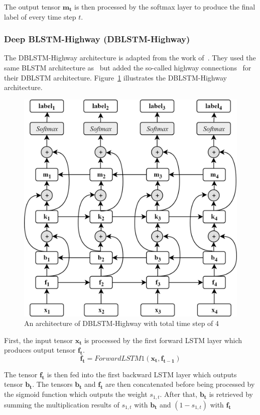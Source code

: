 The output tensor $\mathbf{m_{t}}$ is then processed by the softmax layer to produce the final label of every time step $t$.

\subsubsection{Deep BLSTM-Highway (DBLSTM-Highway)}
The DBLSTM-Highway architecture is adapted from the work of~\cite{he2017deep}. They used the same BLSTM architecture as~\cite{zhou2015end} but added the so-called highway connections~\citep{srivastava2015training} for their DBLSTM architecture. Figure~\ref{fig:dblstmhighway} illustrates the DBLSTM-Highway architecture.

\begin{figure}
	\centering
	\includegraphics[width=0.75\linewidth]{images/dblstmhighway}
	\caption{An architecture of DBLSTM-Highway with total time step of 4}
	\label{fig:dblstmhighway}
\end{figure}

First, the input tensor $\mathbf{x_{t}}$ is processed by the first forward LSTM layer which produces output tensor $\mathbf{f_{t}}$.
\begin{equation}
\label{eq:forwardhighway1}
\mathbf{f_{t}} = ForwardLSTM1(\mathbf{x_{t}}, \mathbf{f_{t-1}})
\end{equation}

The tensor $\mathbf{f_{t}}$ is then fed into the first backward LSTM layer which outputs tensor $\mathbf{b_{t}}$. The tensors $\mathbf{b_{t}}$ and $\mathbf{f_{t}}$ are then concatenated before being processed by the sigmoid function which outputs the weight $s_{1,t}$. After that, $\mathbf{b_{t}}$ is retrieved by summing the multiplication results of $s_{1,t}$ with $\mathbf{b_{t}}$ and $(1 - s_{1,t})$ with $\mathbf{f_{t}}$

